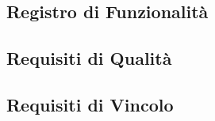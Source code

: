 \subsection{Registro di Funzionalità}

\subsection{Requisiti di Qualità}

\subsection{Requisiti di Vincolo}

